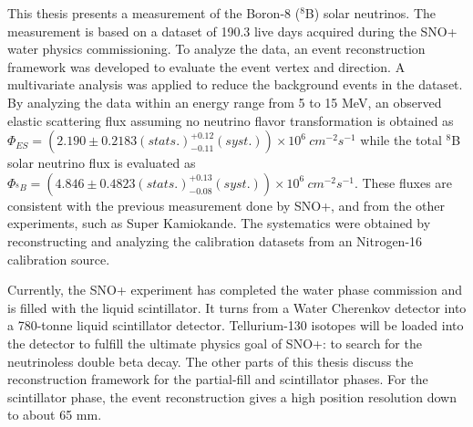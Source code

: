This thesis presents a measurement of the Boron-8 ($^8$B) solar neutrinos. The measurement is based on a dataset of 190.3 live days acquired during the SNO+ water physics commissioning. To analyze the data, an event reconstruction framework was developed to evaluate the event vertex and direction. A multivariate analysis was applied to reduce the background events in the dataset. By analyzing the data within an energy range from 5 to 15 MeV, an observed elastic scattering flux assuming no neutrino flavor transformation is obtained as $\Phi_{ES}=(2.190 \pm 0.2183 (stats.)^{+0.12}_{-0.11}(syst.))\times10^6~cm^{-2}s^{-1}$ while the total $^8$B solar neutrino flux is evaluated as $\Phi_{^8B}=(4.846 \pm 0.4823(stats.)^{+0.13}_{-0.08}(syst.))\times10^6~cm^{-2}s^{-1}$. These fluxes are consistent with the previous measurement done by SNO+\cite{anderson2019measurement}, and from the other experiments, such as Super Kamiokande\cite{abe2016solar}. The systematics were obtained by reconstructing and analyzing the calibration datasets from an Nitrogen-16 calibration source.

Currently, the SNO+ experiment has completed the water phase commission and is filled with the liquid scintillator. It turns from a Water Cherenkov detector into a 780-tonne liquid scintillator detector. Tellurium-130 isotopes will be loaded into the detector to fulfill the ultimate physics goal of SNO+: to search for the neutrinoless double beta decay. The other parts of this thesis discuss the reconstruction framework for the partial-fill and scintillator phases. For the scintillator phase, the event reconstruction gives a high position resolution down to about 65 mm. %